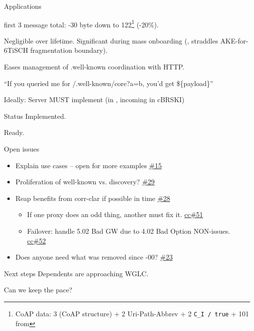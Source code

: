 \begin{frame}{Applications}\large
  \begin{description}
    \item[EDHOC] first 3 message total: -30 byte down to 122\footnote{CoAP data: 3  (CoAP structure) + 2  Uri-Path-Abbrev + 2  \texttt{C\_I / true} + 101 from } (-20\%).

      \bigskip

      Negligible over lifetime. Significant during mass onboarding (, straddles AKE-for-6TiSCH fragmentation boundary).

      \bigskip

    \item[EST/cBRSKI] Eases management of .well-known coordination with HTTP.

    \item[\texttt{-responses}] ``If you queried me for /.well-known/core?a=b, you'd get \$\{payload\}''
  \end{description}

  \vspace{1.5cm}

  Ideally: Server MUST implement (in , incoming in cBRSKI)
\end{frame}

\begin{frame}{Status}\Huge
  Implemented.

  \vspace{1.5cm}

  Ready.
\end{frame}

\begin{frame}{Open issues}\Large
    \begin{itemize}
        \item Explain use cases -- open for more examples \href{https://github.com/core-wg/uri-path-abbrev/issues/15}{\#15}
          \bigskip
        \item Proliferation of well-known vs. discovery? \href{https://github.com/core-wg/uri-path-abbrev/issues/29}{\#29}
          \bigskip
        \item Reap benefits from corr-clar if possible in time \href{https://github.com/core-wg/uri-path-abbrev/issues/28}{\#28}
          \begin{itemize}\large
            \item If one proxy does an odd thing, another must fix it. \href{https://github.com/core-wg/corrclar/issues/51}{cc\#51}
            \item Failover: handle 5.02 Bad GW due to 4.02 Bad Option NON-issues. \href{https://github.com/core-wg/corrclar/issues/52}{cc\#52}
          \end{itemize}
          \bigskip
        \item Does anyone need what was removed since -00? \href{https://github.com/core-wg/uri-path-abbrev/issues/23}{\#23}
    \end{itemize}
\end{frame}

\begin{frame}{Next steps}\Huge
  Dependents are approaching WGLC.

  \vspace{1.5cm}

  Can we keep the pace?
\end{frame}


